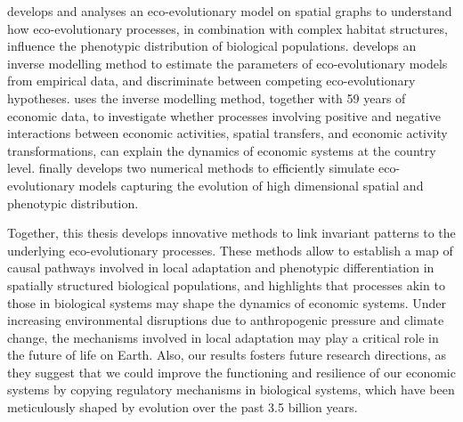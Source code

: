 \Cref{\chapi} develops and analyses an eco-evolutionary model on spatial graphs to understand how eco-evolutionary processes, in combination with complex habitat structures, influence the phenotypic distribution of biological populations. \Cref{\chapii} develops an inverse modelling method to estimate the parameters of eco-evolutionary models from empirical data, and discriminate between competing eco-evolutionary hypotheses. \Cref{\chapiv} uses the inverse modelling method, together with 59 years of economic data, to investigate whether processes involving positive and negative interactions between economic activities, spatial transfers, and economic activity transformations, can explain the dynamics of economic systems at the country level. \Cref{\chapiv} finally develops two numerical methods to efficiently simulate eco-evolutionary models capturing the evolution of high dimensional spatial and phenotypic distribution.

Together, this thesis develops innovative methods to link invariant patterns to the underlying eco-evolutionary processes. These methods allow to establish a map of causal pathways involved in local adaptation and phenotypic differentiation in spatially structured biological populations, and highlights that processes akin to those in biological systems may shape the dynamics of economic systems. 
% 
Under increasing environmental disruptions due to anthropogenic pressure and climate change, the mechanisms involved in local adaptation may play a critical role in the future of life on Earth.
% 
Also, our results fosters future research directions, as they suggest that we could improve the functioning and resilience of our economic systems by copying regulatory mechanisms in biological systems, which have been meticulously shaped by evolution over the past 3.5 billion years. 








